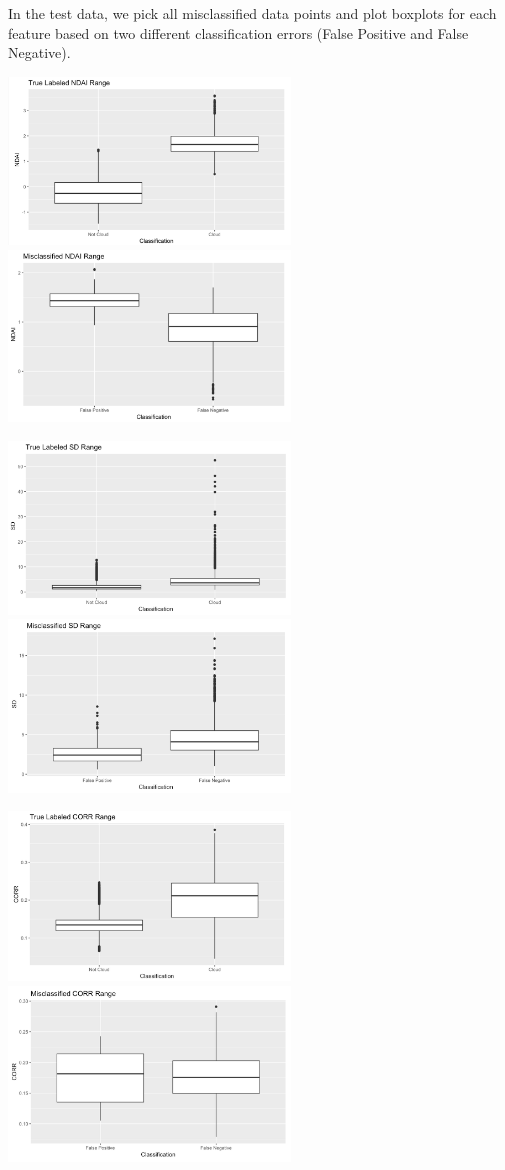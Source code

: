 \documentclass[11pt]{article}
\begin{document}
In the test data, we pick all misclassified data points and plot boxplots for each feature based on two different classification errors (False Positive and False Negative).

\includegraphics[width = 7.5cm]{4(b)1}
\includegraphics[width = 7.5cm]{4(b)2}

\includegraphics[width = 7.5cm]{4(b)3}
\includegraphics[width = 7.5cm]{4(b)4}

\includegraphics[width = 7.5cm]{4(b)5}
\includegraphics[width = 7.5cm]{4(b)6}
\end{document}
